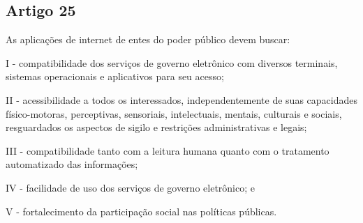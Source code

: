 \subsection{Artigo 25}
As aplicações de internet de entes do poder público devem buscar:

I - compatibilidade dos serviços de governo eletrônico com diversos terminais, sistemas operacionais e aplicativos para seu acesso;

II - acessibilidade a todos os interessados, independentemente de suas capacidades físico-motoras, perceptivas, sensoriais, intelectuais, mentais, culturais e sociais, resguardados os aspectos de sigilo e restrições administrativas e legais;

III - compatibilidade tanto com a leitura humana quanto com o tratamento automatizado das informações;

IV - facilidade de uso dos serviços de governo eletrônico; e

V - fortalecimento da participação social nas políticas públicas.
